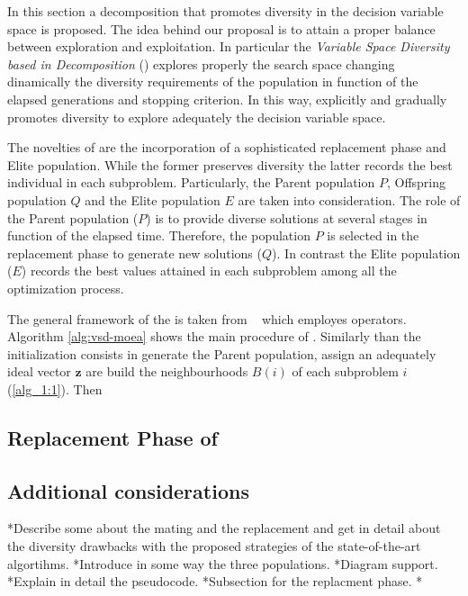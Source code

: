 In this section a decomposition \MOEA{} that promotes diversity in the decision variable space is proposed.
%
The idea behind our proposal is to attain a proper balance between exploration and exploitation.
%
In particular the \textit{Variable Space Diversity \MOEA{} based in Decomposition} (\VSDMOEAD{}) explores properly the search space changing dinamically the diversity requirements of the population in function of the elapsed generations and stopping criterion.
%
In this way, \VSDMOEAD{} explicitly and gradually promotes diversity to explore adequately the decision variable space.
%

The novelties of \VSDMOEAD{} are the incorporation of a sophisticated replacement phase and Elite population.
%
While the former preserves diversity the latter records the best individual in each subproblem.
%
Particularly, the Parent population $P$, Offspring population $Q$ and the Elite population $E$ are taken into consideration.
%
%
The role of the Parent population ($P$) is to provide diverse solutions at several stages in function of the elapsed time.
%
Therefore, the population $P$ is selected in the replacement phase to generate new solutions ($Q$).
%
In contrast the Elite population ($E$) records the best values attained in each subproblem among all the optimization process.
%


The general framework of the \VSDMOEAD{} is taken from \MOEADDE{}~\cite{li2009multiobjective} which employes \DE{} operators.
%
Algorithm \ref{alg:vsd-moea} shows the main procedure of \VSDMOEAD{}.
%
Similarly than \MOEADDE{} the initialization consists in generate the Parent population, assign an adequately ideal vector $\mathbf{z}$ are build the neighbourhoods $B(i)$ of each subproblem $i$ (\ref{alg_1:1}).
%
Then 
%

%



\subsection{Replacement Phase of \VSDMOEAD{} }


\subsection{ Additional considerations}


*Describe some about the mating and the replacement and get in detail about the diversity drawbacks with the proposed strategies of the state-of-the-art algortihms.
*Introduce in some way the three populations.
*Diagram support.
*Explain in detail the pseudocode.
*Subsection for the replacment phase.
*

